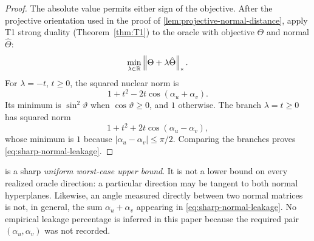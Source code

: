 \begin{proof}
The absolute value permits either sign of the objective.  After the projective
orientation used in the proof of \cref{lem:projective-normal-distance}, apply
T1 strong duality (Theorem~\ref{thm:T1}) to the oracle with objective \(\Theta\) and
normal \(\hat\Theta\):
\[
 \min_{\lambda\in\mathbb{R}}\left\lVert \Theta+\lambda\hat\Theta\right\rVert_{*}.
\]
For \(\lambda=-t\), \(t\ge0\), the squared nuclear norm is
\[
 1+t^2-2t\cos(\alpha_u+\alpha_v).
\]
Its minimum is \(\sin^2\vartheta\) when
\(\cos\vartheta\ge0\), and \(1\) otherwise.  The branch
\(\lambda=t\ge0\) has squared norm
\[
 1+t^2+2t\cos(\alpha_u-\alpha_v),
\]
whose minimum is \(1\) because
\(|\alpha_u-\alpha_v|\le\pi/2\).  Comparing the branches proves
\eqref{eq:sharp-normal-leakage}.
\end{proof}

\begin{boundary}
 is a sharp \emph{uniform worst-case upper
bound}.  It is not a lower bound on every realized oracle direction: a
particular direction may be tangent to both normal hyperplanes.  Likewise, an
angle measured directly between two normal matrices is not, in general, the
sum \(\alpha_u+\alpha_v\) appearing in \eqref{eq:sharp-normal-leakage}.  No
empirical leakage percentage is inferred in this paper because the required
pair \((\alpha_u,\alpha_v)\) was not recorded.
\end{boundary}
